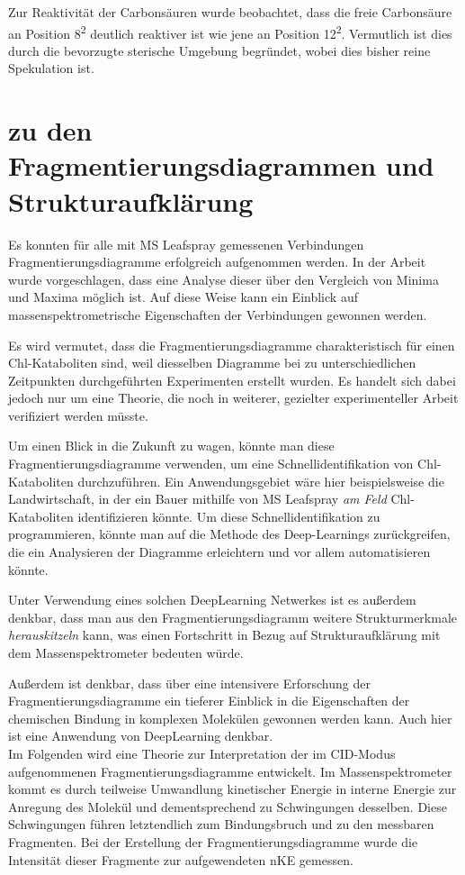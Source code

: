 Zur Reaktivität der Carbonsäuren wurde beobachtet, dass die freie Carbonsäure an Position 8\textsuperscript{2} deutlich reaktiver ist wie jene an Position 12\textsuperscript{2}. Vermutlich ist dies durch die bevorzugte sterische Umgebung begründet, wobei dies bisher reine Spekulation ist.

\section{zu den Fragmentierungsdiagrammen und Strukturaufklärung}

Es konnten für alle mit MS Leafspray gemessenen Verbindungen Fragmentierungsdiagramme erfolgreich aufgenommen werden. In der Arbeit wurde vorgeschlagen, dass eine Analyse dieser über den Vergleich von Minima und Maxima möglich ist. Auf diese Weise kann ein Einblick auf massenspektrometrische Eigenschaften der Verbindungen gewonnen werden. 

Es wird vermutet, dass die Fragmentierungsdiagramme charakteristisch für einen Chl-Kataboliten sind, weil diesselben Diagramme bei zu unterschiedlichen Zeitpunkten durchgeführten Experimenten erstellt wurden. Es handelt sich dabei jedoch nur um eine Theorie, die noch in weiterer, gezielter experimenteller Arbeit verifiziert werden müsste.

Um einen Blick in die Zukunft zu wagen, könnte man diese Fragmentierungsdiagramme verwenden, um eine Schnellidentifikation von Chl-Kataboliten durchzuführen. Ein Anwendungsgebiet wäre hier beispielsweise die Landwirtschaft, in der ein Bauer mithilfe von MS Leafspray \textit{am Feld} Chl-Kataboliten identifizieren könnte. Um diese Schnellidentifikation zu programmieren, könnte man auf die Methode des Deep-Learnings zurückgreifen, die ein Analysieren der Diagramme erleichtern und vor allem automatisieren könnte. 

Unter Verwendung eines solchen DeepLearning Netwerkes ist es außerdem denkbar, dass man aus den Fragmentierungsdiagramm weitere Strukturmerkmale \textit{herauskitzeln} kann, was einen Fortschritt in Bezug auf Strukturaufklärung mit dem Massenspektrometer bedeuten würde.

Außerdem ist denkbar, dass über eine intensivere Erforschung der Fragmentierungsdiagramme ein tieferer Einblick in die Eigenschaften der chemischen Bindung in komplexen Molekülen gewonnen werden kann. Auch hier ist eine Anwendung von DeepLearning denkbar.\\

Im Folgenden wird eine Theorie zur Interpretation der im CID-Modus aufgenommenen Fragmentierungsdiagramme entwickelt. Im Massenspektrometer kommt es durch teilweise Umwandlung kinetischer Energie in interne Energie zur  Anregung des Molekül und dementsprechend zu Schwingungen desselben. Diese Schwingungen führen letztendlich zum Bindungsbruch und zu den messbaren Fragmenten. Bei der Erstellung der Fragmentierungsdiagramme wurde die Intensität dieser Fragmente zur aufgewendeten \gls{nKE} gemessen. 

